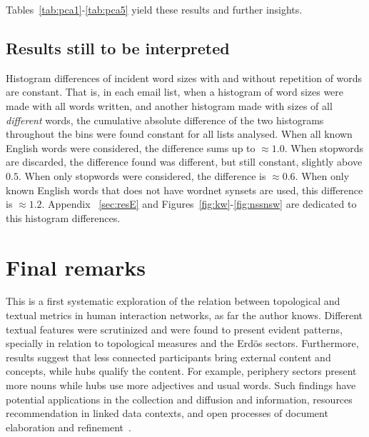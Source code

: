 \documentclass[%
 aip,
 jmp,%
 amsmath,amssymb,
 reprint,%
]{revtex4-1}
\begin{document}
Tables~\ref{tab:pca1}-\ref{tab:pca5} yield these results and further insights.

\subsection{Results still to be interpreted}\label{subsec:sii}
Histogram differences of incident word sizes with and without repetition of words are constant.
That is, in each email list, when a histogram of word sizes were made with all words written,
and another histogram made with sizes of all \emph{different} words,
the cumulative absolute difference of the two histograms throughout the bins were found constant for all lists analysed.
When all known English words were considered, 
the difference sums up to $\approx 1.0$.
When stopwords are discarded,
the difference found was different, but still constant, slightly above $0.5$.
When only stopwords were considered, the difference is $\approx 0.6$.
When only known English words that does not have wordnet synsets are used,
this difference is $\approx 1.2$.
Appendix ~\ref{sec:resE} and Figures~\ref{fig:kw}-\ref{fig:nssnsw} are dedicated to this histogram differences.

\section{Final remarks}\label{sec:remarks}
This is a first systematic exploration of the relation between topological and textual
metrics in human interaction networks, as far the author knows.
Different textual features were scrutinized and were found to present
evident patterns, specially in relation to topological measures and the Erd\"os sectors.
Furthermore, results suggest that less connected participants bring external content and concepts,
while hubs qualify the content.
For example, periphery sectors present more nouns while hubs use more adjectives and usual words.
Such findings have potential applications in the collection and diffusion and information,
resources recommendation in linked data contexts, and open processes of document elaboration and refinement~\cite{ensaio,OPS,pnud5,evoSN,pbr}.
\end{document}
